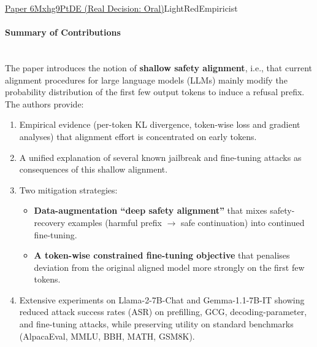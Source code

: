 \documentclass{article} %
\begin{document}
\begin{reviewbox}{\href{https://openreview.net/forum?id=6Mxhg9PtDE}{Paper 6Mxhg9PtDE (Real Decision: Oral)}}{LightRed}{Empiricist}
\scriptsize
\paragraph{Summary of Contributions}
\leavevmode\\[0.1em]
The paper introduces the notion of \textbf{shallow safety alignment}, i.e., that current alignment procedures for large language models (LLMs) mainly modify the probability distribution of the first few output tokens to induce a refusal prefix. The authors provide:
\begin{enumerate}[leftmargin=0.5em, itemsep=0pt, topsep=0pt]
  \item Empirical evidence (per-token KL divergence, token-wise loss and gradient analyses) that alignment effort is concentrated on early tokens.
  \item A unified explanation of several known jailbreak and fine-tuning attacks as consequences of this shallow alignment.
  \item Two mitigation strategies:
  \begin{itemize}
    \item \textbf{Data-augmentation “deep safety alignment”} that mixes safety-recovery examples (harmful prefix $\rightarrow$ safe continuation) into continued fine-tuning.
    \item \textbf{A token-wise constrained fine-tuning objective} that penalises deviation from the original aligned model more strongly on the first few tokens.
  \end{itemize}
  \item Extensive experiments on Llama-2-7B-Chat and Gemma-1.1-7B-IT showing reduced attack success rates (ASR) on prefilling, GCG, decoding-parameter, and fine-tuning attacks, while preserving utility on standard benchmarks (AlpacaEval, MMLU, BBH, MATH, GSM8K).
\end{enumerate}


\end{reviewbox}
\end{document}
